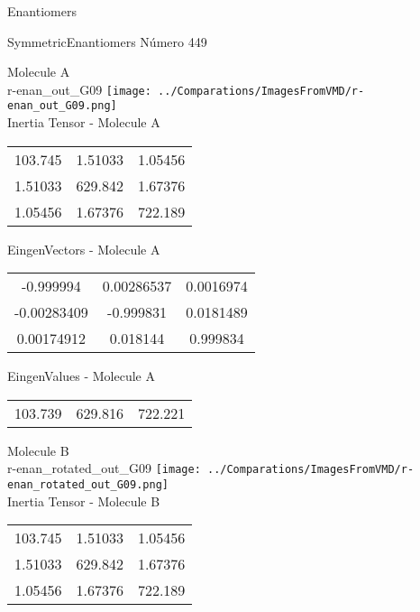 \begin{center}
\vtab
\vtab
\textcolor{NavyBlue}{\Large Enantiomers}
\end{center}

 \newpage

\vtab[-2cm]
\begin{center}
{\large SymmetricEnantiomers \tab Número 449}
\end{center}
\begin{multicols}{2}
\begin{center}

Molecule A \\ 
r-enan\_out\_G09
\texttt{[image: ../Comparations/ImagesFromVMD/r-enan\_out\_G09.png]}
\\
Inertia Tensor - Molecule A \\
\vtab

\begin{tabular}{|c c c|}
103.745	 & 	1.51033	 & 	1.05456	 \\
1.51033	 & 	629.842	 & 	1.67376	 \\
1.05456	 & 	1.67376	 & 	722.189
\end{tabular}

\vtab
 EingenVectors - Molecule A     \\
\vtab
\begin{tabular}{|c c c|}
-0.999994	 & 	0.00286537	 & 	0.0016974	 \\
-0.00283409	 & 	-0.999831	 & 	0.0181489	 \\
0.00174912	 & 	0.018144	 & 	0.999834
\end{tabular}

\vtab
 EingenValues - Molecule A     \\
\vtab
\begin{tabular}{|c c c|}
103.739	 & 	629.816	 & 	722.221	 \\
\end{tabular}
\columnbreak

Molecule B \\ 
r-enan\_rotated\_out\_G09
\texttt{[image: ../Comparations/ImagesFromVMD/r-enan\_rotated\_out\_G09.png]}
\\
Inertia Tensor - Molecule B \\
\vtab

\begin{tabular}{|c c c|}
103.745	 & 	1.51033	 & 	1.05456	 \\
1.51033	 & 	629.842	 & 	1.67376	 \\
1.05456	 & 	1.67376	 & 	722.189
\end{tabular}


\end{center}
\end{multicols}
